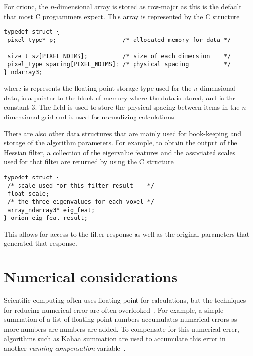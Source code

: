 For \gls{orionc}, the \(n\)-dimensional array  is stored as row-major
as this is the default that most C programmers expect. This array is
represented by the C structure
\begin{lstlisting}
typedef struct {
 pixel_type* p;                   /* allocated memory for data */

 size_t sz[PIXEL_NDIMS];          /* size of each dimension    */
 pixel_type spacing[PIXEL_NDIMS]; /* physical spacing          */
} ndarray3;
\end{lstlisting}
where
 is represents the floating point storage type used
for the \(n\)-dimensional data,  is a pointer to the block of
memory where the data is stored, and  is the constant
\num{3}.
 The  field is used to
store the physical spacing between items in the \(n\)-dimensional grid and is
used for normalizing calculations.

There are also other data structures that are mainly used for book-keeping and
storage of the algorithm parameters. For example, to obtain the output of the
Hessian filter, a collection of the eigenvalue features and the
associated scales used for that filter are returned by using the C structure
\begin{lstlisting}
typedef struct {
 /* scale used for this filter result    */
 float scale;
 /* the three eigenvalues for each voxel */
 array_ndarray3* eig_feat;
} orion_eig_feat_result;
\end{lstlisting}
This allows for access to the filter response as well as
the original parameters that generated that response.

\section{Numerical considerations}

Scientific computing often uses floating point for calculations, but the
techniques for reducing numerical error are often overlooked~\autocite{Goldberg:1991:floating}.
For example, a simple summation of a list of floating point numbers accumulates
numerical errors as more numbers are numbers are added. To compensate for this
numerical error, algorithms such as Kahan summation are used to accumulate this error
in another \emph{running compensation} variable~\autocite{Kahan:1965:summation}.

